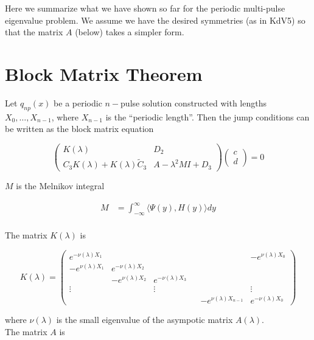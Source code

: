 \documentclass[12pt]{article}
\begin{document}
Here we summarize what we have shown so far for the periodic multi-pulse eigenvalue problem. We assume we have the desired symmetries (as in KdV5) so that the matrix $A$ (below) takes a simpler form.

\section{Block Matrix Theorem}

Let $q_{np}(x)$ be a periodic $n-$pulse solution constructed with lengths $X_0, \dots, X_{n-1}$, where $X_{n-1}$ is the ``periodic length''. Then the jump conditions can be written as the block matrix equation 

\begin{equation}\label{blockeq}
\begin{pmatrix}
K(\lambda) & D_2 \\
C_3 K(\lambda) + K(\lambda) \tilde{C}_3 & A - \lambda^2 MI + D_3
\end{pmatrix}
\begin{pmatrix}c \\ d \end{pmatrix} 
= 0
\end{equation}

$M$ is the Melnikov integral

\begin{align*}
M &= \int_{-\infty}^\infty \langle \Psi(y), H(y) \rangle dy \\
\end{align*}

The matrix $K(\lambda)$ is

\begin{equation}
K(\lambda) = 
\begin{pmatrix}
e^{-\nu(\lambda)X_1} & & & & & -e^{\nu(\lambda)X_0} \\
-e^{\nu(\lambda)X_1} & e^{-\nu(\lambda)X_2} \\
& -e^{\nu(\lambda)X_2} & e^{-\nu(\lambda)X_3} \\
\vdots & & \vdots & &&  \vdots \\
& & & & -e^{\nu(\lambda)X_{n-1}} & e^{-\nu(\lambda)X_0} 
\end{pmatrix}
\end{equation}

where $\nu(\lambda)$ is the small eigenvalue of the asympotic matrix $A(\lambda)$. \\

The matrix $A$ is 
\end{document}

